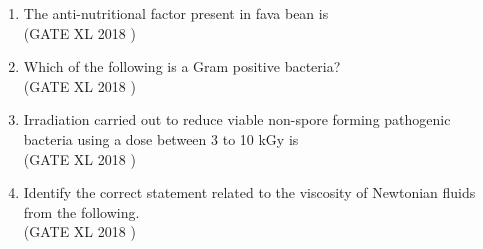 \documentclass[14pt]{extarticle}
\begin{document}
\begin{flushleft}
\begin{enumerate}
\item The anti-nutritional factor present in fava bean is\\
\hfill(GATE XL 2018 )\\
\begin{enumerate}[label=(\Alph*)]
\end{enumerate}

\item Which of the following is a Gram positive bacteria?\\
\hfill(GATE XL 2018 )\\
\begin{enumerate}[label=(\Alph*)]
\end{enumerate}

\item Irradiation carried out to reduce viable non-spore forming pathogenic bacteria using a dose between 3 to 10 kGy is\\
\hfill(GATE XL 2018 )\\
\begin{enumerate}[label=(\Alph*)]
\end{enumerate}

\item Identify the correct statement related to the viscosity of Newtonian fluids from the following.\\
\hfill(GATE XL 2018 )\\


\end{enumerate}
\end{flushleft}
\end{document}
